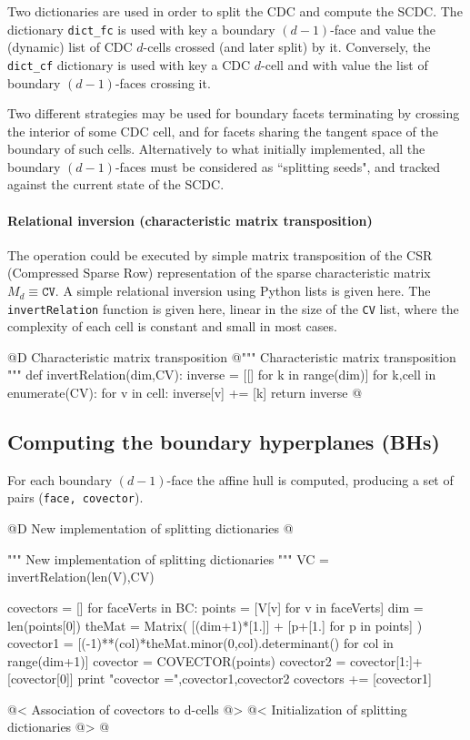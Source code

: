 \documentclass[11pt,oneside]{article}	%
\begin{document}
Two dictionaries are used in order to split the CDC and compute the SCDC. The dictionary \texttt{dict\_fc} is used with key a boundary $(d-1)$-face and value the (dynamic) list of CDC $d$-cells crossed (and later split) by it. Conversely, the  \texttt{dict\_cf} dictionary is used with key a CDC $d$-cell and with value the list of boundary $(d-1)$-faces crossing it.

Two different strategies may be used for boundary facets terminating by crossing the interior of some CDC cell, and for facets sharing the tangent space of the boundary of such cells.
Alternatively to what initially implemented, all the boundary $(d-1)$-faces must be considered as ``splitting seeds", and tracked against the current state of the SCDC.


\paragraph{Relational inversion (characteristic matrix transposition)}

The operation could be executed by simple matrix transposition of the CSR (Compressed Sparse Row) representation of the sparse characteristic matrix $M_d \equiv \texttt{CV}$.
A simple relational inversion using Python lists is given here. The \texttt{invertRelation} function 
is given here, linear in the size of the \texttt{CV} list, where the complexity of each cell is constant and 
small in most cases.

@D Characteristic matrix transposition
@{""" Characteristic matrix transposition """
def invertRelation(dim,CV):
	inverse = [[] for k in range(dim)]
	for k,cell in enumerate(CV):
		for v in cell:
			inverse[v] += [k]
	return inverse
@}


\subsection{Computing the boundary hyperplanes (BHs)}

For each boundary $(d-1)$-face the affine hull is computed, producing a set of pairs (\texttt{face, covector}).

@D New implementation of splitting dictionaries
@{""" New implementation of splitting dictionaries """
VC = invertRelation(len(V),CV)

covectors = []
for faceVerts in BC:
	points = [V[v] for v in faceVerts]
	dim = len(points[0])
	theMat = Matrix( [(dim+1)*[1.]] + [p+[1.] for p in points] )
	covector1 = [(-1)**(col)*theMat.minor(0,col).determinant() 
						for col in range(dim+1)]
	covector = COVECTOR(points)
	covector2 = covector[1:]+[covector[0]] 
	print "covector =",covector1,covector2
	covectors += [covector1]

@< Association of covectors to d-cells @>
@< Initialization of splitting dictionaries @>
@}
\end{document}

